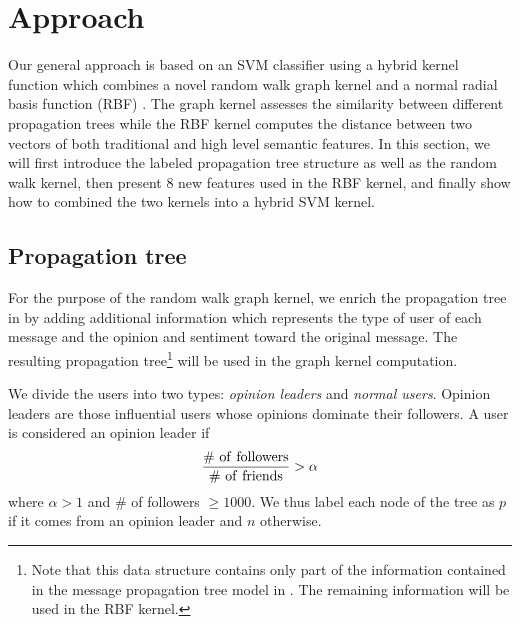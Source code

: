 \section{Approach}
\label{sec:appro}
Our general approach is based on an SVM classifier using a hybrid
kernel function which combines a novel random walk graph kernel and a normal
radial basis function (RBF) \cite{Buhmann:RBF}. The graph kernel assesses
the similarity between different propagation trees while the RBF
kernel computes the distance between two vectors of both traditional and
high level semantic features. In this section, we will first introduce
the labeled propagation tree structure as well as
the random walk kernel, then present 8 new features used in the RBF
kernel, and finally show how to combined the two kernels into a hybrid
SVM kernel.
%

\subsection{Propagation tree}
\label{sec:tree}
For the purpose of the random walk graph kernel, we enrich the propagation tree
in  by adding additional information
which represents the type of user of each message and the opinion and
sentiment toward the original message. The resulting
propagation tree\footnote{Note that this data structure contains only part
of the information contained in the message propagation tree model in . The remaining information will be used in the RBF kernel.} will be used in the graph kernel computation.

We divide the users into two types: {\em opinion leaders} and
{\em normal users}. Opinion leaders are those influential users whose
opinions dominate their followers\cite{bodendorf2009detecting}.
A user is considered an opinion leader if
\begin{equation}
\frac{\rm{\#~ of~ followers}}{\rm{\#~ of~ friends}} > \alpha
\label{eq:alpha}
\end{equation}
where $\alpha > 1$ and \# of followers $\ge 1000$.
We thus label each node of the tree as $p$ if it comes from
an opinion leader and $n$ otherwise.

